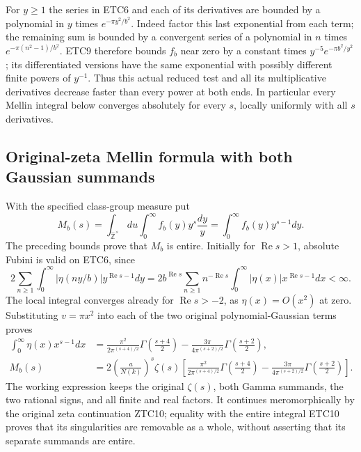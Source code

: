 For $y\ge1$ the series in ETC6 and each of its derivatives are
bounded by a polynomial in $y$ times $e^{-\pi y^2/b^2}$.
Indeed factor this last exponential from each term; the remaining
sum is bounded by a convergent series of a polynomial in $n$ times
$e^{-\pi(n^2-1)/b^2}$. ETC9 therefore bounds $f_b$ near zero
by a constant times $y^{-5}e^{-\pi b^2/y^2}$; its differentiated
versions have the same exponential with possibly different finite
powers of $y^{-1}$. Thus this actual reduced test and all its
multiplicative derivatives decrease faster than every power at both
ends. In particular every Mellin integral below converges absolutely
for every $s$, locally uniformly with all $s$ derivatives.

\subsection{Original-zeta Mellin formula with both Gaussian summands}

With the specified class-group measure put
\begin{equation}\tag{ETC10}
 M_b(s)=\int_{\widehat{\mathbb Z}^{\times}}du
            \int_0^\infty f_b(y)y^s\frac{dy}{y}
       =\int_0^\infty f_b(y)y^{s-1}dy.
\end{equation}
The preceding bounds prove that $M_b$ is entire. Initially for
$\operatorname{Re}s>1$, absolute Fubini is valid on ETC6, since
\[
 2\sum_{n\ge1}\int_0^\infty
    |\eta(ny/b)|y^{\operatorname{Re}s-1}dy
 =2b^{\operatorname{Re}s}\sum_{n\ge1}n^{-\operatorname{Re}s}
        \int_0^\infty|\eta(x)|x^{\operatorname{Re}s-1}dx<\infty.
\]
The local integral converges already for $\operatorname{Re}s>-2$,
as $\eta(x)=O(x^2)$ at zero. Substituting $v=\pi x^2$ into
each of the two original polynomial-Gaussian terms proves
\begin{equation}\tag{ETC11}
 \begin{split}
 \int_0^\infty\eta(x)x^{s-1}dx
 &=\frac{\pi^2}{2\pi^{(s+4)/2}}
       \Gamma\left(\frac{s+4}{2}\right)
   -\frac{3\pi}{4\pi^{(s+2)/2}}
       \Gamma\left(\frac{s+2}{2}\right),\\
 M_b(s)
 &=2\left(\frac a{N(k)}\right)^s\zeta(s)
   \left[
     \frac{\pi^2}{2\pi^{(s+4)/2}}
       \Gamma\left(\frac{s+4}{2}\right)
    -\frac{3\pi}{4\pi^{(s+2)/2}}
       \Gamma\left(\frac{s+2}{2}\right)
   \right].
 \end{split}
\end{equation}
The working expression keeps the original $\zeta(s)$, both Gamma
summands, the two rational signs, and all finite and real factors.
It continues meromorphically by the original zeta continuation
ZTC10; equality with the entire integral ETC10 proves that its
singularities are removable as a whole, without asserting that its
separate summands are entire.

